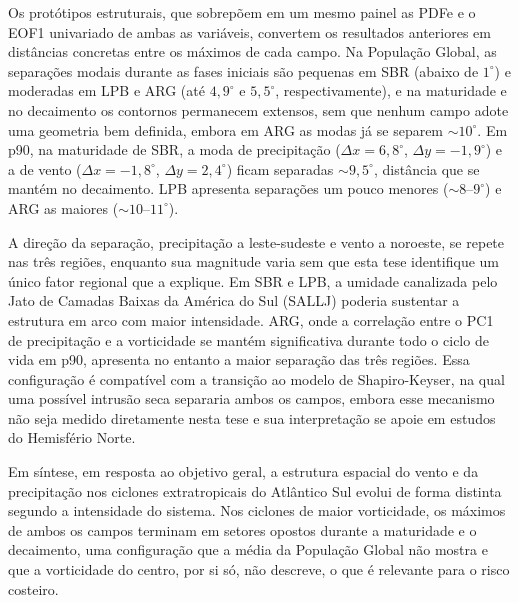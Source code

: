 Os protótipos estruturais, que sobrepõem em um mesmo painel as PDFe e o EOF1 univariado de ambas as variáveis, convertem os resultados anteriores em distâncias concretas entre os máximos de cada campo. Na População Global, as separações modais durante as fases iniciais são pequenas em SBR (abaixo de $1^{\circ}$) e moderadas em LPB e ARG (até $4{,}9^{\circ}$ e $5{,}5^{\circ}$, respectivamente), e na maturidade e no decaimento os contornos permanecem extensos, sem que nenhum campo adote uma geometria bem definida, embora em ARG as modas já se separem ${\sim}10^{\circ}$. Em p90, na maturidade de SBR, a moda de precipitação ($\Delta x = 6{,}8^{\circ}$, $\Delta y = -1{,}9^{\circ}$) e a de vento ($\Delta x = -1{,}8^{\circ}$, $\Delta y = 2{,}4^{\circ}$) ficam separadas ${\sim}9{,}5^{\circ}$, distância que se mantém no decaimento. LPB apresenta separações um pouco menores (${\sim}8$--$9^{\circ}$) e ARG as maiores (${\sim}10$--$11^{\circ}$).

A direção da separação, precipitação a leste-sudeste e vento a noroeste, se repete nas três regiões, enquanto sua magnitude varia sem que esta tese identifique um único fator regional que a explique. Em SBR e LPB, a umidade canalizada pelo Jato de Camadas Baixas da América do Sul (SALLJ) poderia sustentar a estrutura em arco com maior intensidade. ARG, onde a correlação entre o PC1 de precipitação e a vorticidade se mantém significativa durante todo o ciclo de vida em p90, apresenta no entanto a maior separação das três regiões. Essa configuração é compatível com a transição ao modelo de Shapiro-Keyser, na qual uma possível intrusão seca separaria ambos os campos, embora esse mecanismo não seja medido diretamente nesta tese e sua interpretação se apoie em estudos do Hemisfério Norte.

Em síntese, em resposta ao objetivo geral, a estrutura espacial do vento e da precipitação nos ciclones extratropicais do Atlântico Sul evolui de forma distinta segundo a intensidade do sistema. Nos ciclones de maior vorticidade, os máximos de ambos os campos terminam em setores opostos durante a maturidade e o decaimento, uma configuração que a média da População Global não mostra e que a vorticidade do centro, por si só, não descreve, o que é relevante para o risco costeiro.
